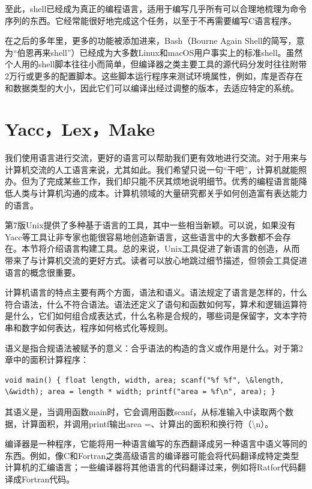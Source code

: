 \documentclass[a4paper,12pt,UTF8,twoside]{ctexbook}
\begin{document}
至此，shell已经成为真正的编程语言，适用于编写几乎所有可以合理地梳理为命令序列的东西。它经常能很好地完成这个任务，以至于不再需要编写C语言程序。

在之后的多年里，更多的功能被添加进来，Bash（Bourne Again Shell的简写，意为“伯恩再来shell”）已经成为大多数Linux和macOS用户事实上的标准shell。虽然个人用的shell脚本往往小而简单，但编译器之类主要工具的源代码分发时往往附带2万行或更多的配置脚本。这些脚本运行程序来测试环境属性，例如，库是否存在和数据类型的大小，因此它们可以编译出经过调整的版本，去适应特定的系统。

\section{Yacc，Lex，Make}

我们使用语言进行交流，更好的语言可以帮助我们更有效地进行交流。对于用来与计算机交流的人工语言来说，尤其如此。我们希望只说一句“干吧”，计算机就能照办。但为了完成某些工作，我们却只能不厌其烦地说明细节。优秀的编程语言能降低人类与计算机沟通的成本。计算机领域的大量研究都关乎如何创造富有表达能力的语言。

第7版Unix提供了多种基于语言的工具，其中一些相当新颖。可以说，如果没有Yacc等工具让非专家也能很容易地创造新语言，这些语言中的大多数都不会存在。本节将介绍语言构建工具。总的来说，Unix工具促进了新语言的创造，从而带来了与计算机交流的更好方式。读者可以放心地跳过细节描述，但领会工具促进语言的概念很重要。

计算机语言的特点主要有两个方面，语法和语义。语法规定了语言是怎样的，什么符合语法，什么不符合语法。语法还定义了语句和函数如何写，算术和逻辑运算符是什么，它们如何组合成表达式，什么名称是合规的，哪些词是保留字，文本字符串和数字如何表达，程序如何格式化等规则。

语义是指合规语法被赋予的意义：合乎语法的构造的含义或作用是什么。对于第2章中的面积计算程序：

\begin{lstlisting}
void main() { float length, width, area; scanf("%f %f", \&length, \&width); area = length * width; printf("area = %f\n", area); }
\end{lstlisting}

其语义是，当调用函数main时，它会调用函数scanf，从标准输入中读取两个数据，计算面积，并调用printf输出area =、计算出的面积和换行符（\textbackslash n）。

编译器是一种程序，它能将用一种语言编写的东西翻译成另一种语言中语义等同的东西。例如，像C和Fortran之类高级语言的编译器可能会将代码翻译成特定类型计算机的汇编语言；一些编译器将其他语言的代码翻译过来，例如将Ratfor代码翻译成Fortran代码。
\end{document}
